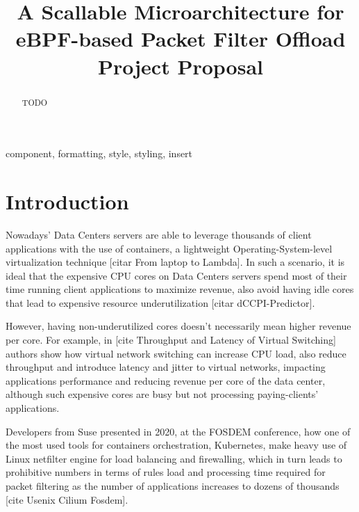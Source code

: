 \documentclass[conference]{IEEEtran}
\begin{document}
\title{A Scallable Microarchitecture for \\ eBPF-based Packet Filter Offload\\
{\large Project Proposal}
}

\author{
}

\maketitle

\begin{abstract}
TODO
\end{abstract}

\begin{IEEEkeywords}
component, formatting, style, styling, insert
\end{IEEEkeywords}

\section{Introduction}
Nowadays' Data Centers servers are able to leverage thousands of client applications with the use of containers, a lightweight Operating-System-level virtualization technique [citar From laptop to Lambda]. In such a scenario, it is ideal that the expensive CPU cores on Data Centers servers spend most of their time running client applications to maximize revenue, also avoid having idle cores that lead to expensive resource underutilization [citar dCCPI-Predictor]. 

However, having non-underutilized cores doesn't necessarily mean higher revenue per core. For example, in [cite Throughput and Latency of Virtual Switching] authors show how virtual network switching can increase CPU load, also reduce throughput and introduce latency and jitter to virtual networks, impacting applications performance and reducing revenue per core of the data center, although such expensive cores are busy but not processing paying-clients' applications.

Developers from Suse presented in 2020, at the FOSDEM conference, how one of the most used tools for containers orchestration, Kubernetes, make heavy use of Linux netfilter engine for load balancing and firewalling, which in turn leads to prohibitive numbers in terms of rules load and processing time required for packet filtering as the number of applications increases to dozens of thousands [cite Usenix Cilium Fosdem].
\end{document}
